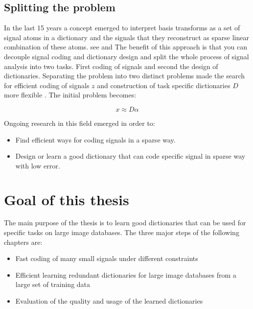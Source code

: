 \subsection{Splitting the problem}
\cite{Rubinstein2010}
In the last 15 years a concept emerged to interpret basis transforms as a set of signal atoms in a dictionary and the signals 
that they reconstruct as sparse linear combination of these atoms.
see \cite{Olshausen1996} and \cite{Mallat1993} The benefit of this approach is that you can decouple signal coding and dictionary design and split the whole process of signal analysis into two tasks.
First coding of signals and second the design of dictionaries.
Separating the problem into two distinct problems made the search for efficient coding of signals $z$ and construction of task specific dictionaries $D$ more flexible \cite{?}.
The initial problem becomes:

\begin{equation}
 x \approx D\alpha
\end{equation}


Ongoing research in this field emerged in order to:
\begin{itemize}
 \item Find efficient ways for coding signals in a sparse way.
 \item Design or learn a good dictionary that can code specific signal in sparse way with low error.
\end{itemize}


\section{Goal of this thesis}

The main purpose of the thesis is to learn good dictionaries that can be used for specific tasks on large image databases.
The three major steps of the following chapters are:
\begin{itemize}
 \item Fast coding of many small signals under different constraints
 \item Efficient learning redundant dictionaries for large image databases from a large set of training data
 \item Evaluation of the quality and usage of the learned dictionaries
\end{itemize}

